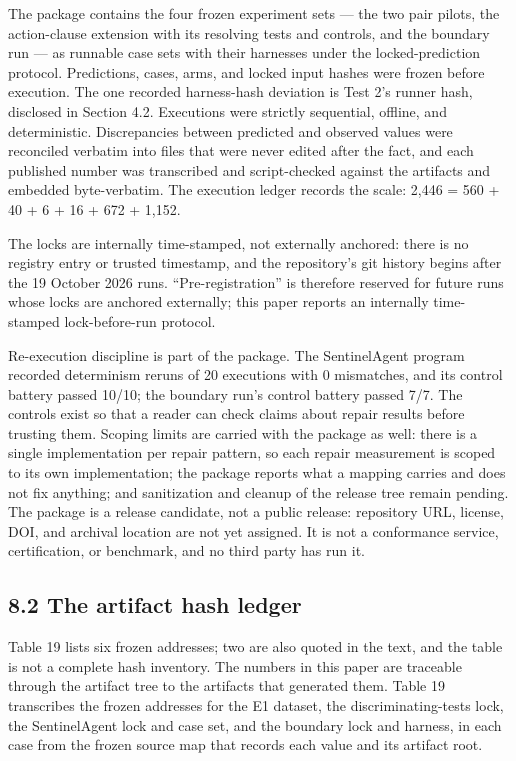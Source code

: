 \documentclass[
  10pt,
]{article}
\renewcommand{\_}{\allowbreak\origunderscore}
\begin{document}
The package contains the four frozen experiment sets --- the two pair
pilots, the action-clause extension with its resolving tests and
controls, and the boundary run --- as runnable case sets with their
harnesses under the locked-prediction protocol. Predictions, cases,
arms, and locked input hashes were frozen before execution. The one
recorded harness-hash deviation is Test 2's runner hash, disclosed in
Section 4.2. Executions were strictly sequential, offline, and
deterministic. Discrepancies between predicted and observed values were
reconciled verbatim into files that were never edited after the fact,
and each published number was transcribed and script-checked against the
artifacts and embedded byte-verbatim. The execution ledger records the
scale: 2,446 = 560 + 40 + 6 + 16 + 672 + 1,152.

The locks are internally time-stamped, not externally anchored: there is
no registry entry or trusted timestamp, and the repository's git history
begins after the 19 October 2026 runs. ``Pre-registration'' is therefore
reserved for future runs whose locks are anchored externally; this paper
reports an internally time-stamped lock-before-run protocol.

Re-execution discipline is part of the package. The SentinelAgent
program recorded determinism reruns of 20 executions with 0 mismatches,
and its control battery passed 10/10; the boundary run's control battery
passed 7/7. The controls exist so that a reader can check claims about
repair results before trusting them. Scoping limits are carried with the
package as well: there is a single implementation per repair pattern, so
each repair measurement is scoped to its own implementation; the package
reports what a mapping carries and does not fix anything; and
sanitization and cleanup of the release tree remain pending. The package
is a release candidate, not a public release: repository URL, license,
DOI, and archival location are not yet assigned. It is not a conformance
service, certification, or benchmark, and no third party has run it.

\subsection{8.2 The artifact hash
ledger}\label{the-artifact-hash-ledger}

Table 19 lists six frozen addresses; two are also quoted in the text,
and the table is not a complete hash inventory. The numbers in this
paper are traceable through the artifact tree to the artifacts that
generated them. Table 19 transcribes the frozen addresses for the E1
dataset, the discriminating-tests lock, the SentinelAgent lock and case
set, and the boundary lock and harness, in each case from the frozen
source map that records each value and its artifact root.
\end{document}

